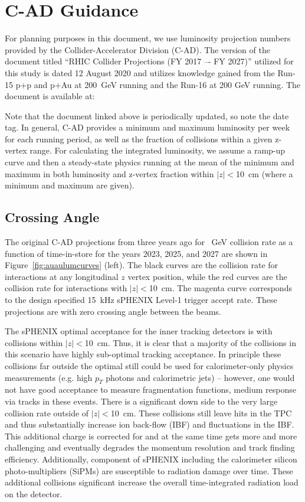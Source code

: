 \chapter{C-AD Guidance}
\label{chap:cad}

For planning purposes in this document, we use luminosity projection numbers provided by the Collider-Accelerator Division (C-AD).   The version of the document titled 
``RHIC Collider Projections (FY 2017 –- FY 2027)'' utilized for this study is dated 12 August 2020 and utilizes knowledge gained from the Run-15 p+p and p+Au at 200~GeV running and the Run-16 \auau at 200 GeV running.   The document is available at:

\bigskip
{\color{blue}{http://www.rhichome.bnl.gov/RHIC/Runs/RhicProjections.pdf}} 
\bigskip

Note that the document linked above is periodically updated, so note the date tag.  In general, C-AD provides a minimum and maximum luminosity per week for each running period, as well as the fraction of collisions within a given z-vertex range. For calculating the integrated luminosity, we assume a ramp-up curve and then a steady-state physics running at the mean of the minimum and maximum in both luminosity and z-vertex fraction within $|z|<$10~cm (where a minimum and maximum are given).  

\section{Crossing Angle}

The original C-AD projections from three years ago for ~GeV collision rate as a function of time-in-store for the years 2023, 2025, and 2027 are shown in Figure~\ref{fig:auaulumcurves} (left).    The black curves are the collision rate for interactions at any longitudinal $z$ vertex position, while the red curves are the collision rate for interactions with $|z|<$10~cm.    The magenta curve corresponds to the design specified 15~kHz sPHENIX Level-1 trigger accept rate.
These projections are with zero crossing angle between the beams.   

The sPHENIX optimal acceptance for the inner tracking detectors is with collisions within $|z|<$10~cm.   Thus, it is clear that a majority of the collisions in this scenario have highly sub-optimal tracking acceptance.   In principle these collisions far outside the optimal still could be used for calorimeter-only physics measurements (e.g. high $p_{T}$ photons and calorimetric jets) -- however, one would not have good acceptance to measure fragmentation functions, medium response via tracks in these events.    There is a significant down side to the very large collision rate outside of $|z|<$10~cm.   These collisions still leave hits in the TPC and thus substantially increase ion back-flow (IBF) and fluctuations in the IBF.   This additional charge is corrected for and at the same time gets more and more challenging and eventually degrades the momentum resolution and track finding efficiency.    Additionally, component of sPHENIX including the calorimeter silicon photo-multipliers (SiPMs) are susceptible to radiation damage over time.   These additional collisions significant increase the overall time-integrated radiation load on the detector.

